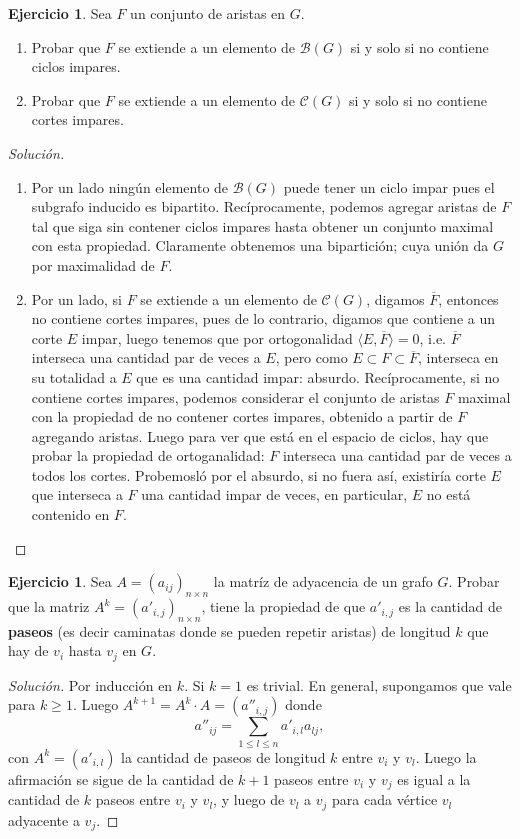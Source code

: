 \documentclass[12pt]{report}
\theoremstyle{plain}
\theoremstyle{definition}
\newtheorem{exercise}[theorem]{Ejercicio}
\newenvironment{solution}{\begin{proof}[Solución]}{\end{proof}}
\renewcommand{\bar}[1]{\overline{#1}}
\begin{document}
\begin{exercise}
Sea $F$ un conjunto de aristas en $G$.
\begin{enumerate}
\item Probar que $F$ se extiende a un elemento de $\mathcal B (G)$ si y solo si no contiene ciclos impares.
\item Probar que $F$ se extiende a un elemento de $\mathcal C (G)$ si y solo si no contiene cortes impares.
\end{enumerate}
\end{exercise}
\begin{solution}
\begin{enumerate}
\item Por un lado ningún elemento de $\mathcal B (G)$ puede tener un ciclo impar pues el subgrafo inducido es bipartito.
Recíprocamente, podemos agregar aristas de $F$ tal que siga sin contener ciclos impares hasta obtener un conjunto
maximal con esta propiedad. Claramente obtenemos una bipartición; cuya unión da $G$ por maximalidad de $F$.
\item Por un lado, si $F$ se extiende a un elemento de $\mathcal C (G)$, digamos $\bar F$, entonces no contiene
cortes
impares,
pues de lo contrario, digamos que contiene a un corte $E$ impar, luego tenemos que por ortogonalidad $\langle E, \bar F \rangle = 0$, i.e. $\bar F$  interseca una cantidad par de veces a $E$, pero como $E \subset F \subset \bar F$, interseca en su totalidad a $E$ que es una cantidad impar: absurdo. Recíprocamente, si no contiene cortes impares, podemos considerar el conjunto de aristas $F$ maximal con la propiedad de no contener cortes impares, obtenido a partir de $F$ agregando aristas. Luego para ver que está en el espacio de ciclos, hay que probar la propiedad de ortoganalidad: $F$ interseca una cantidad par de veces a todos los cortes. Probemosló por el absurdo, si no fuera así, existiría corte $E$ que interseca a $F$ una cantidad impar de veces, en particular, $E$ no está contenido en $F$.
\end{enumerate}
\end{solution}



\begin{exercise}
Sea $A = (a_{ij})_{n \times n}$ la matríz de adyacencia de un grafo $G$. Probar que la matriz $A^k = (a'_{i,j})_{n\times n}$, tiene la propiedad de que $a'_{i,j}$ es la cantidad de \textbf{paseos} (es decir caminatas donde se pueden repetir aristas) de longitud $k$ que hay de $v_i$ hasta $v_j$ en $G$.
\end{exercise}
\begin{solution}
Por inducción en $k$. Si $k = 1$ es trivial. En general, supongamos que vale para $k \geq 1$. Luego $A^{k+1} =
A^k \cdot A = (a''_{i,j})$ donde
\[
    a''_{ij} = \sum_{1 \leq l \leq n} a'_{i,l} a_{l j},
\]
con $A^k = (a'_{i,l})$ la cantidad de paseos de longitud $k$ entre $v_i$ y $v_l$. Luego la afirmación se sigue de
la cantidad de $k+1$ paseos entre $v_i$ y $v_j$ es igual a la cantidad de $k$ paseos entre $v_i$ y $v_l$, y
luego de $v_l$ a $v_j$ para cada vértice $v_l$ adyacente a $v_j$.
\end{solution}
\end{document}
